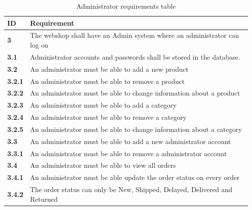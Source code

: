 \documentclass[a4paper,12pt]{article}
\begin{document}
\begin{table}[htpb]
	\centering
	\caption{Administrator requirements table}
	\label{my-label}
	\begin{tabular}{|l|l|}
		\hline
		\textbf{ID}    & \textbf{Requirement}                                                       \\ \hline
		\textbf{3}     & The webshop shall have an Admin system where an administrator can log on   \\ \hline
		\textbf{3.1}   & Administrator accounts and passwords shall be stored in the database.      \\ \hline
		\textbf{3.2}   & An administrator must be able to add a new product                         \\ \hline
		\textbf{3.2.1} & An administrator must be able to remove a product                          \\ \hline
		\textbf{3.2.2} & An administrator must be able to change information about a product        \\ \hline
		\textbf{3.2.3} & An administrator must be able to add a category                            \\ \hline
		\textbf{3.2.4} & An administrator must be able to remove a category                         \\ \hline
		\textbf{3.2.5} & An administrator must be able to change information about a category       \\ \hline
		\textbf{3.3}   & An administrator must be able to add a new administrator account           \\ \hline
		\textbf{3.3.1} & An administrator must be able to remove a administrator account            \\ \hline
		\textbf{3.4}   & An administrator must be able to view all orders                           \\ \hline
		\textbf{3.4.1} & An administrator must be able update the order status on every order       \\ \hline
		\textbf{3.4.2} & The order status can only be New, Shipped, Delayed, Delivered and Returned \\ \hline
	\end{tabular}
\end{table}
\end{document}
